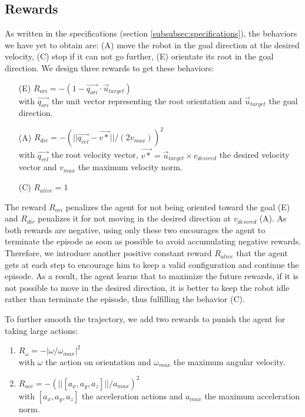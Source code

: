 \subsection{Rewards}
As written in the specifications (section \ref{subsubsec:specifications}), the behaviors we have yet to obtain are: (A) move the robot in the goal direction at the desired velocity, (C) stop if it can not go further, (E) orientate its root in the goal direction. 
We design three rewards to get these behaviors:
\begin{enumerate}
  \item[(E)] $R_{ori} = -( 1 -  \overrightarrow{q_{ori}} \cdot \overrightarrow{u}_{target} )$ \\
  with $\overrightarrow{q_{ori}}$ the unit vector representing the root orientation and $\overrightarrow{u}_{target}$ the goal direction.
  \item[(A)] $R_{dir} = -( ||\overrightarrow{q_{vel}} - \overrightarrow{v*} ||/(2v_{max}) )^2$\\
  with $\overrightarrow{q_{vel}}$ the root velocity vector, $\overrightarrow{v*}=\overrightarrow{u}_{target} \times v_{desired}$ the desired velocity vector and $v_{max}$ the maximum velocity norm.
  \item[(C)] $R_{alive} = 1$ 
\end{enumerate}
The reward $R_{ori}$ penalizes the agent for not being oriented toward the goal (E) and $R_{dir}$ penalizes it for not moving in the desired direction at $v_{desired}$ (A). 
As both rewards are negative, using only these two encourages the agent to terminate the episode as soon as possible to avoid accumulating negative rewards. 
Therefore, we introduce another positive constant reward $R_{alive}$ that the agent gets at each step to encourage him to keep a valid configuration and continue the episode.
As a result, the agent learns that to maximize the future rewards, if it is not possible to move in the desired direction, it is better to keep the robot idle rather than terminate the episode, thus fulfilling the behavior (C).

To further smooth the trajectory, we add two rewards to punish the agent for taking large actions:
\begin{enumerate}
    \item $R_{\omega} = - | \omega / \omega_{max} |^2 $ \\
    with $\omega$ the action on orientation and $\omega_{max}$ the maximum angular velocity.
    \item $R_{acc} = - (|| [a_{x},a_{y},a_{z}] || / a_{max})^2 $ \\
    with $[a_{x},a_{y},a_{z}]$ the acceleration actions and $a_{max}$ the maximum acceleration norm.
\end{enumerate}

